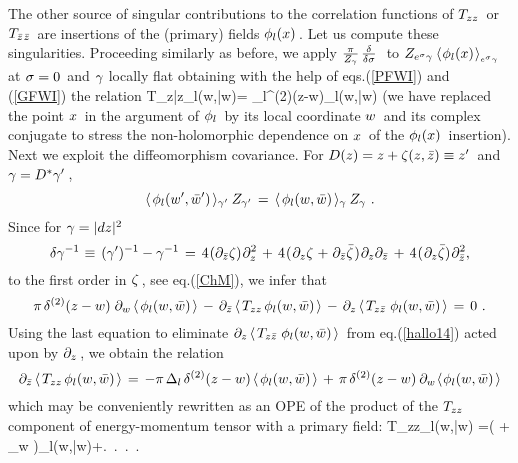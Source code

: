 The other source of singular contributions to the correlation functions
of \s$T_{zz}\hspace{0.05cm}$ or \s$T_{\bar z\hspace{0.025cm}\bar z}\hspace{0.05cm}$
are insertions of the (primary) fields
\s$\phi_l(x)\hspace{0.05cm}$. \s Let us compute these singularities.
Proceeding similarly as before, we apply
\s\s$\frac{{\pi}}{{Z_\ga}}\s\frac{\delta}{{\delta \sigma}}\s\s$
to \s\s$Z_{e^{\sigma}\ga}\s\m\langle\m \phi_l(x)\m
\rangle_{_{e^{\sigma}\ga}}\s\s$ at \s$\sigma=0\hspace{0.05cm}$
and ${{\gamma}}$ locally flat obtaining with the help of eqs.\s\s(\ref{PFWI})
and (\ref{GFWI}) the relation
\qq
\langle\m T_{z\bar{z}}\s\s \phi_l(w,\bar w)\m\rangle\s =\s
\pi\s
\Delta_l\s\m \delta^{(2)}(z-w)\s\s\langle\s \phi_l(w,\bar w)\s\rangle
\label{hallo14}
\qqq
(we have replaced the point \s$x\hspace{0.05cm}$ in the argument of
\s$\phi_l\hspace{0.05cm}$ by its local coordinate \s$w\hspace{0.05cm}$
and its complex conjugate to stress
the non-holomorphic dependence on \s$x\hspace{0.05cm}$
of the \s$\phi_l(x)\hspace{0.05cm}$ insertion).
Next we exploit the diffeomorphism covariance.  For \s$D(z)
= z+\zeta(z,\bar z)\equiv z'\hspace{0.05cm}$
and \s${{\gamma}}=D^* {{\gamma}}'\hspace{0.05cm}$, $$ \langle\s
\phi_l(w',{\bar w}')\s\rangle_{{\ga'}}\s\m Z_{\ga'}\s=\s
\langle\s\phi_l(w,\bar w)\s\rangle_{{\ga}}\s\m Z_{{\ga}}\ .$$
Since for \s${{\gamma}}=|dz|^2\hspace{0.05cm}$ $$\delta {{\gamma}}^{-1}\hspace{0.025cm}
\equiv\hspace{0.05cm} ({{\gamma}}')^{-1}-{{\gamma}}^{-1}\hspace{0.05cm}=\hspace{0.05cm}
4\hspace{0.025cm}(\partial_{\bar{z}}\zeta)\hspace{0.025cm}
\partial^2_z\hspace{0.05cm}+\hspace{0.05cm}4\hspace{0.025cm}(\hspace{0.025cm}\partial_z \zeta\hspace{0.025cm}+
\hspace{0.025cm}\partial_{\bar{z}}\bar\zeta\hspace{0.025cm})\hspace{0.025cm}
\partial_z \partial_{\bar{z}}\hspace{0.05cm}+\hspace{0.05cm}4\hspace{0.025cm}
(\hspace{0.025cm}\partial_{z}\bar{\zeta})\hspace{0.025cm}
\partial^2_{\bar{z}},
$$ to the first order in \s$\zeta\hspace{0.05cm}$, \s see eq.\s\s(\ref{ChM}), we infer
that $$ \pi\s \delta^{(2)}(z-w)\s\s \partial_w\s
\langle\s\phi_l(w,\bar w)\s\rangle\s - \s
\partial_{\bar{z}}\s\langle\s
T_{zz}\s \phi_l(w,\bar w)\s\rangle
\s-\s \partial_z\s\langle\s T_{z {\bar{z}}}
\s\s\phi_l(w,\bar w)\s\rangle\s=\s0\ .
$$ Using the last equation to eliminate \s$\partial_z
\s\langle\s T_{z{\bar{z}}}\s\s\phi_l(w,\bar w)\s\rangle\s$
from eq.\s\s(\ref{hallo14}) acted upon by
\s$\partial_z\hspace{0.05cm}$, \s
we obtain the relation $$
\partial_{\bar{z}}\s\langle\s T_{zz}\s\phi_l(w,\bar w)
\s\rangle\s =\s- \pi\s\Delta_l\s \delta^{(2)}
(z-w)\s\langle\s\phi_l(w,\bar w)\s\rangle\s + \s\pi\s
\delta^{(2)}(z-w)\s\m\partial_w\m\langle\m\phi_l(w,\bar w)\s
\rangle$$ which may be conveniently rewritten as an
OPE of the product of the
\s$T_{zz}\hspace{0.05cm}$ component of
energy-momentum tensor with a primary field:
\qq
\langle\s T_{zz}\s\phi_l(w,\bar w)\s\rangle
  \s=\s\left( \s+
\s{}\s \partial_w
  \right)\m\langle\s \phi_l(w,\bar w)\s\rangle\s\s+\s\s\m.\ \s.\
\s.\
\s\s.
\label{SHEXP2}
\qqq
\vs 0.3cm

